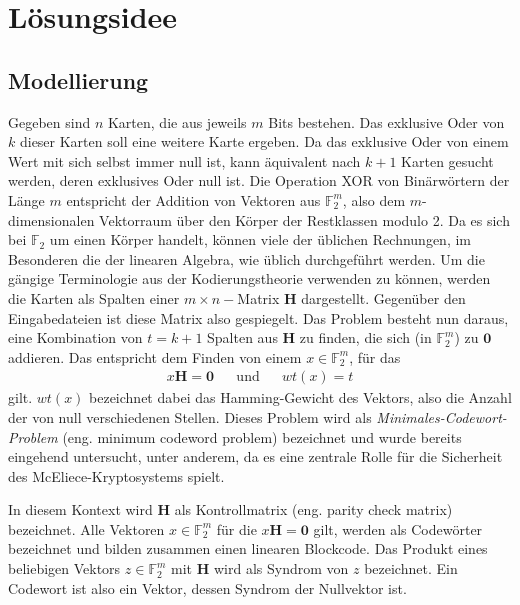 \documentclass[a4paper,10pt,ngerman]{scrartcl}
\begin{document}
\maketitle
\tableofcontents

\section{Lösungsidee}
\subsection{Modellierung}
Gegeben sind $n$ Karten, die aus jeweils $m$ Bits bestehen. Das exklusive Oder von $k$ dieser Karten soll eine weitere Karte ergeben.
Da das exklusive Oder von einem Wert mit sich selbst immer null ist, kann äquivalent nach $k + 1$ Karten gesucht werden, deren exklusives Oder null ist.
Die Operation XOR von Binärwörtern der Länge $m$ entspricht der Addition von Vektoren aus $\mathbb{F}_2^m$, also dem $m$-dimensionalen Vektorraum über den Körper der Restklassen modulo 2. 
Da es sich bei $\mathbb{F}_2$ um einen Körper handelt, können viele der üblichen Rechnungen, im Besonderen die der linearen Algebra, wie üblich durchgeführt werden. 
Um die gängige Terminologie aus der Kodierungstheorie verwenden zu können, werden die Karten als Spalten einer $m\times n-$Matrix $\mathbf{H}$ dargestellt. Gegenüber den Eingabedateien ist diese Matrix also gespiegelt. 
Das Problem besteht nun daraus, eine Kombination von $t = k + 1$ Spalten aus $\mathbf{H}$ zu finden, die sich (in $\mathbb{F}_2^m$) zu $\mathbf{0}$ addieren. Das entspricht dem Finden von einem $x \in \mathbb{F}^m_2$, für das 
\begin{align*}
    x \mathbf{H} = \mathbf{0} && \text{und} && wt(x) = t
\end{align*}
gilt. $wt(x)$ bezeichnet dabei das Hamming-Gewicht des Vektors, also die Anzahl der von null verschiedenen Stellen. 
Dieses Problem wird als \textit{Minimales-Codewort-Problem} (eng. minimum codeword problem) bezeichnet und wurde bereits eingehend untersucht, unter anderem, da es eine zentrale Rolle für die Sicherheit des McEliece-Kryptosystems spielt. 

In diesem Kontext wird $\mathbf{H}$ als Kontrollmatrix (eng. parity check matrix) bezeichnet.
Alle Vektoren $x \in \mathbb{F}^m_2$ für die $x \mathbf{H} = \mathbf{0}$ gilt,  werden als Codewörter bezeichnet und bilden zusammen einen linearen Blockcode. Das Produkt eines beliebigen Vektors $z \in \mathbb{F}^m_2$ mit $\mathbf{H}$ wird als Syndrom von $z$ bezeichnet. Ein Codewort ist also ein Vektor, dessen Syndrom der Nullvektor ist. 
\end{document}
